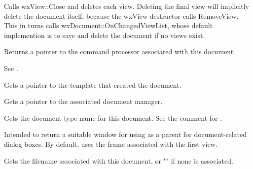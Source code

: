 
Calls wxView::Close and deletes each view. Deleting the final view will implicitly
delete the document itself, because the wxView destructor calls RemoveView. This
in turns calls wxDocument::OnChangedViewList, whose default implemention is to
save and delete the document if no views exist.

\label{wxdocumentgetcommandprocessor}


Returns a pointer to the command processor associated with this document.

See .

\label{wxdocumentgetdocumenttemplate}


Gets a pointer to the template that created the document.

\label{wxdocumentgetdocumentmanager}


Gets a pointer to the associated document manager.

\label{wxdocumentgetdocumentname}


Gets the document type name for this document. See the comment for .

\label{wxdocumentgetdocumentwindow}


Intended to return a suitable window for using as a parent for document-related
dialog boxes. By default, uses the frame associated with the first view.

\label{wxdocumentgetfilename}


Gets the filename associated with this document, or "" if none is
associated.

\label{wxdocumentgetfirstview}

